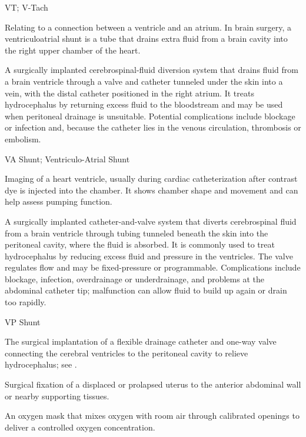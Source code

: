 \synonyms
VT; V-Tach

 Relating to a connection between a ventricle and an atrium. In brain surgery, a ventriculoatrial shunt is a tube that drains extra fluid from a brain cavity into the right upper chamber of the heart.

 A surgically implanted cerebrospinal-fluid diversion system that drains fluid from a brain ventricle
through a valve and catheter tunneled under the skin into a vein, with the distal catheter positioned in the right atrium.
It treats hydrocephalus by returning excess fluid to the bloodstream and may be used when peritoneal drainage is unsuitable.
Potential complications include blockage or infection and, because the catheter lies in the venous circulation,
thrombosis or embolism.

\synonyms
VA Shunt; Ventriculo-Atrial Shunt

 Imaging of a heart ventricle, usually during cardiac catheterization after contrast dye is injected into the chamber. It shows chamber shape and movement and can help assess pumping function.

 A surgically implanted catheter-and-valve system that diverts cerebrospinal fluid from a brain ventricle
through tubing tunneled beneath the skin into the peritoneal cavity, where the fluid is absorbed. It is commonly used
to treat hydrocephalus by reducing excess fluid and pressure in the ventricles. The valve regulates flow and may be
fixed-pressure or programmable. Complications include blockage, infection, overdrainage or underdrainage, and problems
at the abdominal catheter tip; malfunction can allow fluid to build up again or drain too rapidly.

\synonyms
VP Shunt

 The surgical implantation of a flexible drainage catheter and one-way valve connecting the cerebral ventricles to the peritoneal cavity to relieve hydrocephalus; see .

 Surgical fixation of a displaced or prolapsed uterus to the anterior abdominal wall or nearby supporting tissues.

 An oxygen mask that mixes oxygen with room air through calibrated openings to deliver a controlled oxygen concentration.

